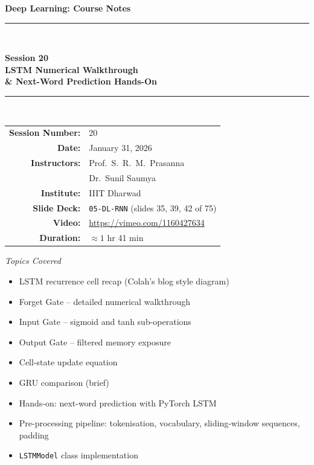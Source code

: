 \documentclass[12pt,a4paper]{article}
\begin{document}
\begin{titlepage}
  \centering
  \vspace*{2cm}
  {\LARGE\bfseries Deep Learning: Course Notes\par}
  \vspace{0.8cm}
  \rule{\linewidth}{0.5pt}\\[0.4cm]
  {\huge\bfseries Session 20\\[0.3cm]
   LSTM Numerical Walkthrough\\[0.2cm]
   \& Next-Word Prediction Hands-On\par}
  \rule{\linewidth}{0.5pt}\\[1.5cm]

  \begin{tabular}{rl}
    \textbf{Session Number:} & 20 \\[4pt]
    \textbf{Date:}           & January 31, 2026 \\[4pt]
    \textbf{Instructors:}    & Prof.\ S.\ R.\ M.\ Prasanna \\
                             & Dr.\ Sunil Saumya \\[4pt]
    \textbf{Institute:}      & IIIT Dharwad \\[4pt]
    \textbf{Slide Deck:}     & \texttt{05-DL-RNN} (slides 35, 39, 42 of 75) \\[4pt]
    \textbf{Video:}          & \url{https://vimeo.com/1160427634} \\[4pt]
    \textbf{Duration:}       & $\approx 1$ hr 41 min \\
  \end{tabular}

  \vfill
  {\large\itshape Topics Covered}\\[0.4cm]
  \begin{itemize}[leftmargin=4cm,rightmargin=4cm]
    \item LSTM recurrence cell recap (Colah's blog style diagram)
    \item Forget Gate -- detailed numerical walkthrough
    \item Input Gate -- sigmoid and tanh sub-operations
    \item Output Gate -- filtered memory exposure
    \item Cell-state update equation
    \item GRU comparison (brief)
    \item Hands-on: next-word prediction with PyTorch LSTM
    \item Pre-processing pipeline: tokenisation, vocabulary, sliding-window sequences, padding
    \item \texttt{LSTMModel} class implementation
  \end{itemize}
  \vfill
\end{titlepage}
\end{document}
